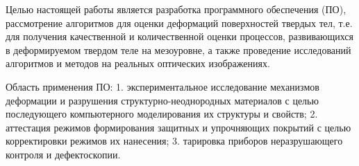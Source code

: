 Целью настоящей работы является разработка программного обеспечения (ПО), рассмотрение алгоритмов для оценки деформаций поверхностей твердых тел, т.е. для получения качественной и количественной оценки процессов, развивающихся в деформируемом твердом теле на мезоуровне, а также проведение исследований алгоритмов и методов на реальных оптических изображениях.

Область применения ПО:
1. экспериментальное исследование механизмов деформации и разрушения структурно-неоднородных материалов с целью последующего компьютерного моделирования их структуры и свойств;
2. аттестация режимов формирования защитных и упрочняющих покрытий с целью корректировки режимов их нанесения;
3. тарировка приборов неразрушающего контроля и дефектоскопии.

